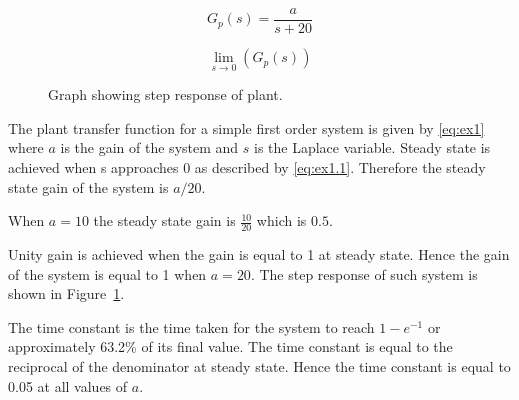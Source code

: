 \renewcommand{\ex}{ex1} 

\begin{equation}
    G_{p}\left(s\right)=\frac{a}{s+20}
    \label{eq:\ex}
\end{equation}

\begin{equation}
    \lim_{s\to0}\left(G_{p}\left(s\right)\right)
    \label{eq:\ex.1}
\end{equation}

\begin{figure}[ht!]
    \centering
    
    \caption{Graph showing step response of plant. \appendixamble{\ex}}
    \label{fig:\ex}
\end{figure}\FloatBarrier

The plant transfer function for a simple first order system is given by \eqref{eq:\ex} where $a$ is the gain of the system and $s$ is the Laplace variable. Steady state is achieved when s approaches 0 as described by \eqref{eq:\ex.1}. Therefore the steady state gain of the system is $a/20$.

When $a=10$ the steady state gain is $\frac{10}{20}$ which is $0.5$.

Unity gain is achieved when the gain is equal to 1 at steady state. Hence the gain of the system is equal to 1 when $a=20$. The step response of such system is shown in Figure~\ref{fig:\ex}.

The time constant is the time taken for the system to reach $1-e^{-1}$ or approximately 63.2\% of its final value. The time constant is equal to the reciprocal of the denominator at steady state. Hence the time constant is equal to 0.05 at all values of $a$.




